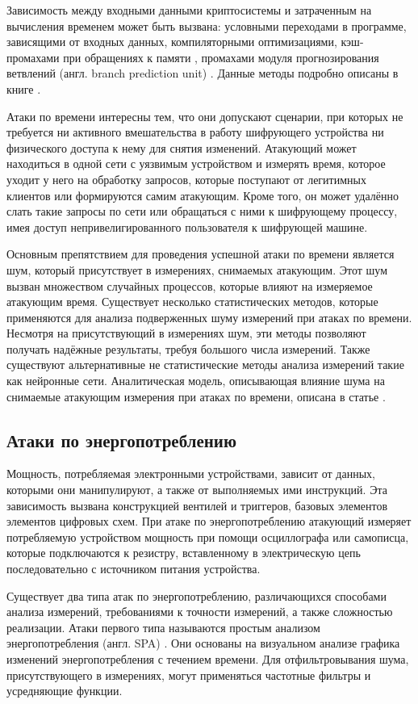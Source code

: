 Зависимость между входными данными криптосистемы и затраченным на вычисления
временем может быть вызвана: условными переходами в программе, зависящими от
входных данных, компиляторными оптимизациями, кэш-промахами при обращениях к
памяти \cite{bernstein}, промахами модуля прогнозирования ветвлений (англ.
branch prediction unit) \cite{bpa} \cite{sbpa}. Данные методы подробно описаны в
книге \cite{cren}.

Атаки по времени интересны тем, что они допускают сценарии, при которых
не требуется ни активного вмешательства в работу шифрующего устройства ни
физического доступа к нему для снятия изменений. Атакующий может находиться в
одной сети с уязвимым устройством и измерять время, которое уходит у него на
обработку запросов, которые поступают от легитимных клиентов или формируются
самим атакующим. Кроме того, он может удалённо слать такие запросы по сети
или обращаться с ними к шифрующему процессу, имея доступ непривелигированного
пользователя к шифрующей машине.

Основным препятствием для проведения успешной атаки по времени является шум,
который присутствует в измерениях, снимаемых атакующим. Этот шум вызван
множеством случайных процессов, которые влияют на измеряемое атакующим время.
Существует несколько статистических методов, которые применяются для анализа
подверженных шуму измерений при атаках по времени. Несмотря на присутствующий
в измерениях шум, эти методы позволяют получать надёжные результаты, требуя
большого числа измерений. Также существуют альтернативные не статистические
методы анализа измерений такие как нейронные сети. Аналитическая модель,
описывающая влияние шума на снимаемые атакующим измерения при атаках по времени,
описана в статье \cite{anmodel}.

\subsection{Атаки по энергопотреблению}

Мощность, потребляемая электронными устройствами, зависит от данных, которыми
они манипулируют, а также от выполняемых ими инструкций. Эта зависимость вызвана
конструкцией вентилей и триггеров, базовых элементов элементов цифровых схем.
При атаке по энергопотреблению атакующий измеряет потребляемую устройством
мощность при помощи осциллографа или самописца, которые подключаются к резистру,
вставленному в электрическую цепь последовательно с источником питания устройства.

Существует два типа атак по энергопотреблению, различающихся способами анализа
измерений, требованиями к точности измерений, а также сложностью реализации.
Атаки первого типа называются простым анализом энергопотребления (англ. SPA)
\cite{spa} \cite{spa1} \cite{kocher-dpa}. Они основаны на визуальном анализе
графика изменений энергопотребления с течением времени. Для отфильтровывания
шума, присутствующего в измерениях, могут применяться частотные фильтры и
усредняющие функции.

